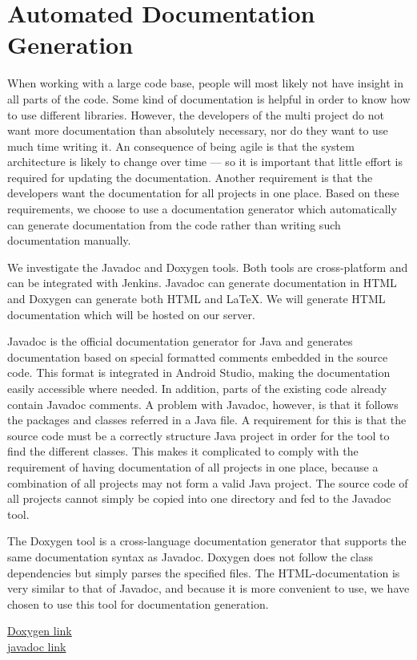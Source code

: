 

\section{Automated Documentation Generation}\label{sec:automated_documentation_gen}
When working with a large code base, people will most likely not have insight in all parts of the code. Some kind of documentation is helpful in order to know how to use different libraries. However, the developers of the multi project do not want more documentation than absolutely necessary, nor do they want to use much time writing it. An consequence of being agile is that the system architecture is likely to change over time --- so it is important that little effort is required for updating the documentation. Another requirement is that the developers want the documentation for all projects in one place. Based on these requirements, we choose to use a documentation generator which automatically can generate documentation from the code rather than writing such documentation manually.

We investigate the Javadoc and Doxygen tools. Both tools are cross-platform and can be integrated with Jenkins. Javadoc can generate documentation in HTML and Doxygen can generate both HTML and \LaTeX. We will generate HTML documentation which will be hosted on our server.

Javadoc is the official documentation generator for Java and generates documentation based on special formatted comments embedded in the source code. This format is integrated in Android Studio, making the documentation easily accessible where needed. In addition, parts of the existing code already contain Javadoc comments. A problem with Javadoc, however, is that it follows the packages and classes referred in a Java file. A requirement for this is that the source code must be a correctly structure Java project in order for the tool to find the different classes. This makes it complicated to comply with the requirement of having documentation of all projects in one place, because a combination of all projects may not form a valid Java project. The source code of all projects cannot simply be copied into one directory and fed to the Javadoc tool.

The Doxygen tool is a cross-language documentation generator that supports the same documentation syntax as Javadoc. Doxygen does not follow the class dependencies but simply parses the specified files. The HTML-documentation is very similar to that of Javadoc, and because it is more convenient to use, we have chosen to use this tool for documentation generation.

\href{http://www.stack.nl/~dimitri/doxygen/}{Doxygen link}\\
\href{http://www.oracle.com/technetwork/java/javase/documentation/index-jsp-135444.html}{javadoc link}
